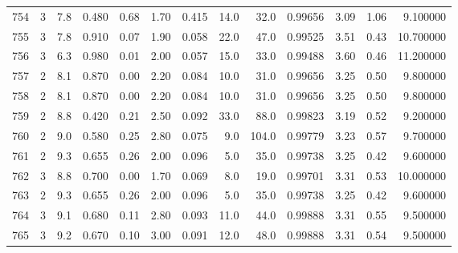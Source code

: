 \begin{tabular}{lrrrrrrrrrrrr}
754  &        3 &            7.8 &             0.480 &         0.68 &            1.70 &      0.415 &                 14.0 &                  32.0 &  0.99656 &  3.09 &       1.06 &   9.100000 \\
755  &        3 &            7.8 &             0.910 &         0.07 &            1.90 &      0.058 &                 22.0 &                  47.0 &  0.99525 &  3.51 &       0.43 &  10.700000 \\
756  &        3 &            6.3 &             0.980 &         0.01 &            2.00 &      0.057 &                 15.0 &                  33.0 &  0.99488 &  3.60 &       0.46 &  11.200000 \\
757  &        2 &            8.1 &             0.870 &         0.00 &            2.20 &      0.084 &                 10.0 &                  31.0 &  0.99656 &  3.25 &       0.50 &   9.800000 \\
758  &        2 &            8.1 &             0.870 &         0.00 &            2.20 &      0.084 &                 10.0 &                  31.0 &  0.99656 &  3.25 &       0.50 &   9.800000 \\
759  &        2 &            8.8 &             0.420 &         0.21 &            2.50 &      0.092 &                 33.0 &                  88.0 &  0.99823 &  3.19 &       0.52 &   9.200000 \\
760  &        2 &            9.0 &             0.580 &         0.25 &            2.80 &      0.075 &                  9.0 &                 104.0 &  0.99779 &  3.23 &       0.57 &   9.700000 \\
761  &        2 &            9.3 &             0.655 &         0.26 &            2.00 &      0.096 &                  5.0 &                  35.0 &  0.99738 &  3.25 &       0.42 &   9.600000 \\
762  &        3 &            8.8 &             0.700 &         0.00 &            1.70 &      0.069 &                  8.0 &                  19.0 &  0.99701 &  3.31 &       0.53 &  10.000000 \\
763  &        2 &            9.3 &             0.655 &         0.26 &            2.00 &      0.096 &                  5.0 &                  35.0 &  0.99738 &  3.25 &       0.42 &   9.600000 \\
764  &        3 &            9.1 &             0.680 &         0.11 &            2.80 &      0.093 &                 11.0 &                  44.0 &  0.99888 &  3.31 &       0.55 &   9.500000 \\
765  &        3 &            9.2 &             0.670 &         0.10 &            3.00 &      0.091 &                 12.0 &                  48.0 &  0.99888 &  3.31 &       0.54 &   9.500000 \\

\end{tabular}
